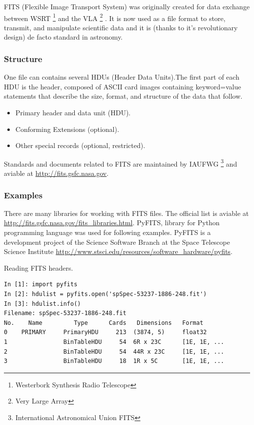 \bigskip

FITS (Flexible Image Transport System) was originally created for data
exchange between WSRT \footnote{Westerbork Synthesis Radio Telescope}
and the VLA \footnote{Very Large Array} \citep{fits1997}. It is now
used as a file format to store, transmit, and manipulate scientific
data and it is (thanks to it's revolutionary design) de facto standard
in astronomy.


\subsubsection*{Structure}

One file can contains several HDUs (Header Data Units).The first part
of each HDU is the header, composed of ASCII card images containing
\textrm{keyword=value} statements that describe the size, format, and
structure of the data that follow.

\begin{itemize}
\item Primary header and data unit (HDU).
\item Conforming Extensions (optional).
\item Other special records (optional, restricted).
\end{itemize}


Standards and documents related to FITS are maintained by IAUFWG
\footnote{International Astronomical Union FITS} and aviable at
\url{http://fits.gsfc.nasa.gov}.

\subsubsection*{Examples}

There are many libraries for working with FITS files. The official
list is aviable at
\url{http://fits.gsfc.nasa.gov/fits_libraries.html}. PyFITS, library
for Python programming language was used for following
examples. PyFITS is a development project of the Science Software
Branch at the Space Telescope Science Institute
\url{http://www.stsci.edu/resources/software_hardware/pyfits}.


Reading FITS headers.

\begin{lstlisting}
In [1]: import pyfits
In [2]: hdulist = pyfits.open('spSpec-53237-1886-248.fit')
In [3]: hdulist.info()
Filename: spSpec-53237-1886-248.fit
No.    Name         Type      Cards   Dimensions   Format
0    PRIMARY     PrimaryHDU     213  (3874, 5)     float32
1                BinTableHDU     54  6R x 23C      [1E, 1E, ...
2                BinTableHDU     54  44R x 23C     [1E, 1E, ...
3                BinTableHDU     18  1R x 5C       [1E, 1E, ...
\end{lstlisting}

